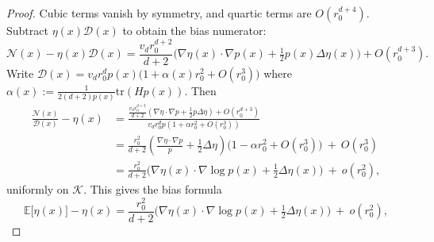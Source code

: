 \begin{proof}
Cubic terms vanish by symmetry, and quartic terms are $O(r_0^{d+4})$. 
Subtract $\eta(x)\mathcal{D}(x)$ to obtain the bias numerator:
\[
\mathcal{N}(x)-\eta(x)\mathcal{D}(x)
= \frac{v_dr_0^{d+2}}{d+2}\Big(\nabla\eta(x)\cdot\nabla p(x) + \tfrac{1}{2}p(x)\Delta\eta(x)\Big) + O(r_0^{d+3}).
\]
Write $\mathcal{D}(x)=v_d r_0^d p(x)\big(1+\alpha(x)r_0^2+O(r_0^3)\big)$ where $\alpha(x):=\frac{1}{2(d+2)p(x)}\mathrm{tr}(H p(x))$. Then
\begin{align*}
\frac{\mathcal{N}(x)}{\mathcal{D}(x)}-\eta(x)
&= \frac{ \frac{v_d r_0^{d+2}}{d+2}\left(\nabla\eta\cdot\nabla p + \frac{1}{2}p\Delta\eta\right) + O(r_0^{d+3})}{ v_d r_0^d p \left(1+\alpha r_0^2+O(r_0^3)\right)}\\[0.5ex]
&= \frac{r_0^2}{d+2}\left(\frac{\nabla\eta\cdot\nabla p}{p} + \frac{1}{2}\Delta\eta\right)\Big(1-\alpha r_0^2+O(r_0^3)\Big)\ +\ O(r_0^3)\\[0.5ex]
&= \frac{r_0^2}{d+2}\Big(\nabla\eta(x)\cdot\nabla\log p(x) + \tfrac{1}{2}\Delta\eta(x)\Big)\ +\ o(r_0^2),
\end{align*}
uniformly on $\mathcal{K}$. This gives the bias formula
\[
\mathbb{E}\big[\widehat{\eta}(x)\big]-\eta(x)
=
\frac{r_0^2}{d+2}\Big(\nabla\eta(x)\cdot\nabla\log p(x) + \tfrac{1}{2}\Delta\eta(x)\Big)\ +\ o(r_0^2),
\]



\end{proof}
